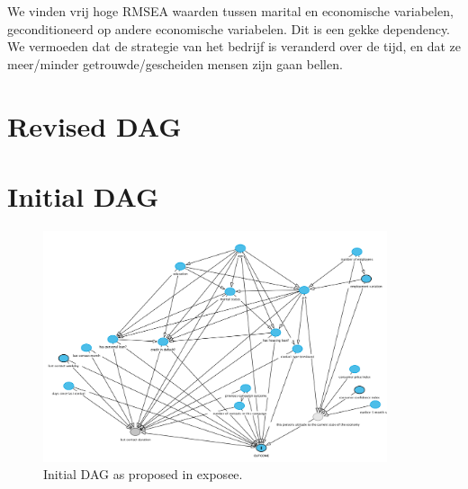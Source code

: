 \documentclass[11pt]{article}
\begin{document}
\begin{multicols}{2}
We vinden vrij hoge RMSEA waarden tussen marital en economische variabelen, geconditioneerd op andere economische variabelen. Dit is een gekke dependency. We vermoeden dat de strategie van het bedrijf is veranderd over de tijd, en dat ze meer/minder getrouwde/gescheiden mensen zijn gaan bellen.

\section{Revised DAG}

\end{multicols}
\appendix
\section{Initial DAG}
\label{sec:initial_dag}
\begin{figure}[h]
	\centering
	\includegraphics[width=0.9\textwidth]{images/initial_dag}
	\caption{Initial DAG as proposed in exposee.}
	\label{fig:initial_dag}
\end{figure}
\end{document}
